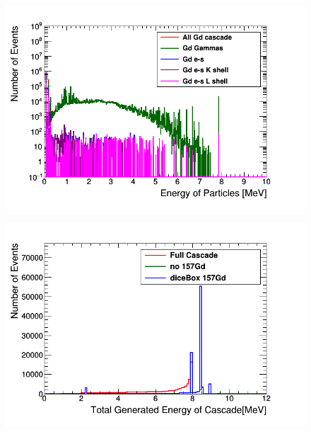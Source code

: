 \begin{figure}[H]
 \centering
 \includegraphics[width=0.7\linewidth]{Chapter4/Figs/Raster/gadolinium/gadoliniumEnergiesCascade.png}
 \label{fig:gadoliniumEnergiesCascade}
\end{figure}


\begin{figure}[H]
 \centering
 \includegraphics[width=0.7\linewidth]{Chapter4/Figs/Raster/gadolinium/TotalGeneratedEnergyOfCascadeFinalStateDicebox.png}
 \label{fig:TotalGeneratedEnergyOfCascadeFinalStateDicebox}
\end{figure}

